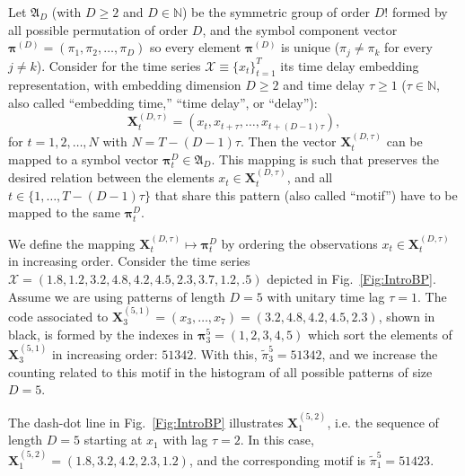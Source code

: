 \documentclass[journal]{IEEEtran}
\renewcommand{\Bbb}{\mathbb}
\begin{document}
Let ${\mathfrak A}_{D}$ (with $D \geq 2$ and $D \in {\Bbb N}$) be the symmetric group of order $D!$ formed by all 
possible permutation of order $D$, and the symbol component vector 
${\bm \pi}^{(D)} = (\pi_1, \pi_2, \dots, \pi_D)$ so every element ${\bm \pi}^{(D)}$ is unique 
($\pi_j \neq \pi_k$ for every $j \neq k$). 
Consider for the time series ${\mathcal X} \equiv \{x_t\}_{t=1}^{T}$ its time delay embedding representation,
with embedding dimension $D \geq 2$ and time delay $\tau \geq 1$ ($\tau \in {\Bbb N}$, also called ``embedding time,'' ``time delay'', or ``delay''):
\begin{equation} 
	\label{eq:time-delay}
	{\mathbf X}^{(D,\tau)}_t =( x_t,x_{t+\tau},\dots,x_{t+(D-1)\tau} ) ,
\end{equation} 
for $t = 1,2,\dots,N$ with $N = T-(D-1) \tau$.
Then the vector ${\mathbf X}^{(D,\tau)}_t$ can be mapped to a symbol vector ${\bm \pi}_t^D \in {\mathfrak A}_{D}$. 
This mapping is such that preserves the desired relation between the elements 
$x_t  \in {\mathbf X}^{(D,\tau)}_t$, and all $t \in \{1,\dots,T-(D-1)\tau\}$ that share this pattern (also called ``motif'') have to be mapped to the same 
${\bm \pi}_t^{D}$.

We define the mapping ${\mathbf X}_t^{(D,\tau)} \mapsto {\mathbf \pi}_t^{D}$ by ordering the observations $x_t \in {\mathbf X}_t^{(D,\tau)}$ in increasing order.
Consider the time series $\mathcal X = (1.8, 1.2, 3.2, 4.8, 4.2, 4.5, 2.3, 3.7, 1.2, .5)$ depicted in Fig.~\ref{Fig:IntroBP}.
Assume we are using patterns of length $D=5$ with unitary time lag $\tau=1$.
The code associated to $\mathbf X_{3}^{(5,1)}=(x_3,\dots,x_7)=(3.2, 4.8, 4.2, 4.5, 2.3)$, shown in black, is formed by the indexes in $\bm\pi_3^{5}=(1,2,3,4,5)$ which sort the elements of $\mathbf X_{3}^{(5,1)}$ in increasing order: $51342$.
With this, $\widetilde{\pi}_3^{5} = 51342$, and we increase the counting related to this motif in the histogram of all possible patterns of size $D=5$.

The dash-dot line in Fig.~\ref{Fig:IntroBP} illustrates $\mathbf X_{1}^{(5,2)}$, i.e. the sequence of length $D=5$ starting at $x_1$ with lag $\tau=2$.
In this case, $\mathbf X_{1}^{(5,2)}= (1.8, 3.2, 4.2, 2.3, 1.2)$, and the corresponding motif is $\widetilde{\pi}_1^{5}=51423$.
\end{document}
